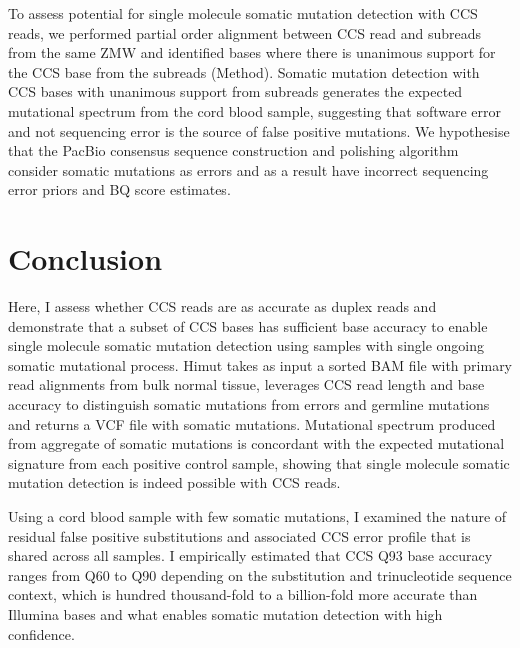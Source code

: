 To assess potential for single molecule somatic mutation detection with CCS reads, we performed partial order alignment between CCS read and subreads from the same ZMW and identified bases where there is unanimous support for the CCS base from the subreads (Method). Somatic mutation detection with CCS bases with unanimous support from subreads generates the expected mutational spectrum from the cord blood sample, suggesting that software error and not sequencing error is the source of false positive mutations. We hypothesise that the PacBio consensus sequence construction and polishing algorithm consider somatic mutations as errors and as a result have incorrect sequencing error priors and BQ score estimates. 

\section{Conclusion}

Here, I assess whether CCS reads are as accurate as duplex reads and demonstrate that a subset of CCS bases has sufficient base accuracy to enable single molecule somatic mutation detection using samples with single ongoing somatic mutational process. Himut takes as input a sorted BAM file with primary read alignments from bulk normal tissue, leverages CCS read length and base accuracy to distinguish somatic mutations from errors and germline mutations and returns a VCF file with somatic mutations. Mutational spectrum produced from aggregate of somatic mutations is concordant with the expected mutational signature from each positive control sample, showing that single molecule somatic mutation detection is indeed possible with CCS reads. 

Using a cord blood sample with few somatic mutations, I examined the nature of residual false positive substitutions and associated CCS error profile that is shared across all samples. I empirically estimated that CCS Q93 base accuracy ranges from Q60 to Q90 depending on the substitution and trinucleotide sequence context, which is hundred thousand-fold to a billion-fold more accurate than Illumina bases and what enables somatic mutation detection with high confidence. 

